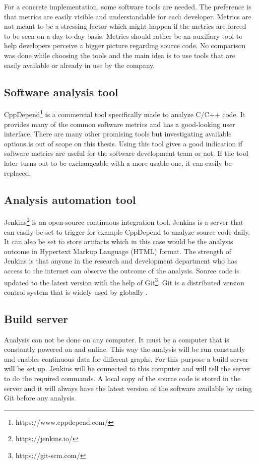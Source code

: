 For a concrete implementation, some software tools are needed. The preference is that metrics are easily visible and understandable for each developer. Metrics are not meant to be a stressing factor which might happen if the metrics are forced to be seen on a day-to-day basis. Metrics should rather be an auxiliary tool to help developers perceive a bigger picture regarding source code. No comparison was done while choosing the tools and the main idea is to use tools that are easily available or already in use by the company.

\subsection{Software analysis tool}
\label{chap:sofanatool}

CppDepend\footnote{https://www.cppdepend.com/} is a commercial tool specifically made to analyze C/C++ code. It provides many of the common software metrics and has a good-looking user interface. There are many other promising tools but investigating available options is out of scope on this thesis. Using this tool gives a good indication if software metrics are useful for the software development team or not. If the tool later turns out to be exchangeable with a more usable one, it can easily be replaced.

\subsection{Analysis automation tool}

Jenkins\footnote{https://jenkins.io/} is an open-source continuous integration tool. Jenkins is a server that can easily be set to trigger for example CppDepend to analyze source code daily. It can also be set to store artifacts which in this case would be the analysis outcome in Hypertext Markup Language (HTML) format.  The strength of Jenkins is that anyone in the research and development department who has access to the internet can observe the outcome of the analysis. Source code is updated to the latest version with the help of Git\footnote{https://git-scm.com/}. Git is a distributed version control system that is widely used by globally \cite{gitsurvey}.

\subsection{Build server}

Analysis can not be done on any computer. It must be a computer that is constantly powered on and online. This way the analysis will be run constantly and enables continuous data for different graphs. For this purpose a build server will be set up. Jenkins will be connected to this computer and will tell the server to do the required commands. A local copy of the source code is stored in the server and it will always have the latest version of the software available by using Git before any analysis.

